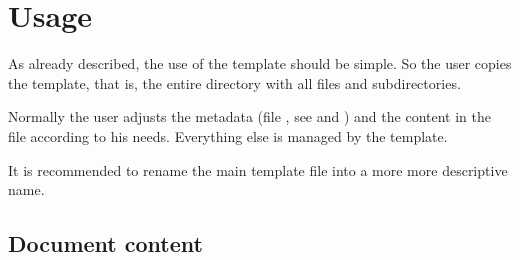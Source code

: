 
\section{Usage}

As already described, the use of the template should be simple. So the user
copies the template, that is, the entire directory with all files and
subdirectories.
\bigbreak

Normally the user adjusts the metadata (file ,
see  and ) and the
content in the file  according to his
needs. Everything else is managed by the template.
\bigbreak

It is recommended to rename the main template file 
into a more more descriptive name.








\subsection{Document content}

